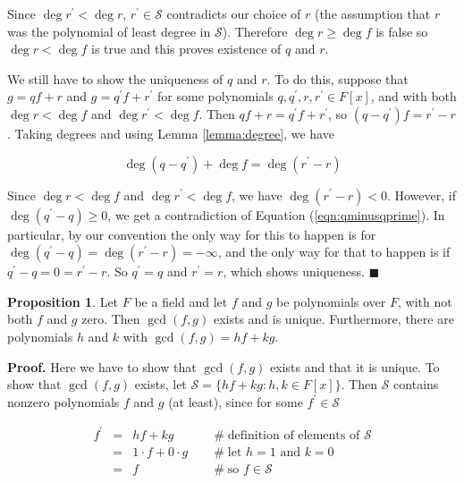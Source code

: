 \documentclass{article}
\theoremstyle{definition}
\newtheorem{proposition}{Proposition}[section]
\begin{document}
\bigskip
\noindent
Since $\deg r^\prime < \deg r$, $r^\prime \in \mathcal{S} $
contradicts our choice of $r$ (the assumption that $r$ was the
polynomial of least degree in $\mathcal{S}$).  Therefore $\deg r
\geq \deg f$ is false so $\deg r < \deg f$ is true and this
proves existence of $q$ and $r$.

\bigskip
\noindent
We still have to show the uniqueness of $q$ and $r$. To do this,
suppose that $g = qf +r$ and $g = q^{\prime} f + r^\prime$ for
some polynomials $q,q^\prime, r,r^\prime \in F[x]$, and with both
$\deg r < \deg f$ and $\deg r^\prime < \deg f$. Then $qf +r =
q^{\prime} f +r^{\prime}$, so $(q - q^{\prime})f = r^\prime -
r$. Taking degrees and using Lemma \ref{lemma:degree}, we have

\begin{equation}
\deg (q - q^{\prime}) + \deg f  = \deg (r^\prime - r)
\label{eqn:qminusqprime}
\end{equation}

\bigskip
\noindent
Since $\deg r < \deg f$ and $\deg r^\prime < \deg f$, we have
$\deg (r^\prime - r) < 0$. However, if $\deg(q^\prime - q) \geq
0$, we get a contradiction of Equation (\ref{eqn:qminusqprime}). 
In particular, by our convention the only way for this to happen 
is for $\deg(q^\prime - q) = \deg(r^\prime - r) = - \infty$, and 
the only way for that to happen is if $q^\prime - q = 0 = r^\prime 
- r$. So $q^\prime = q$ and $r^\prime =r$, which shows
uniqueness. $\blacksquare$

\bigskip
\begin{proposition}
Let $F$ be a field and let $f$ and $g$ be polynomials over $F$,
with not both $f$ and $g$ zero. Then $\gcd(f, g)$ exists and is
unique.  Furthermore, there are polynomials $h$ and $k$ with
$\gcd(f, g) = hf + kg$.
\end{proposition}

\noindent
\textbf{Proof.}  Here we have to show that $\gcd(f, g)$ exists
and that it is unique. To show that $\gcd(f, g)$ exists, let
$\mathcal{S} = \{hf + kg : h, k \in F [x]\}$. Then $\mathcal{S}$
contains nonzero polynomials $f$ and $g$ (at least), since for
some $f^\prime \in \mathcal{S}$

\begin{equation}
\begin{array}{rcll}
f^\prime
&=& hf +  kg                    
		&\quad \mathrel{\#} \text{definition of elements of } \mathcal{S} \\
[5pt]
&=& 1 \cdot f + 0 \cdot g       
		&\quad \mathrel{\#} \text{let $h = 1$ and $k = 0$}  \\
[5pt]
&=& f                           
		&\quad \mathrel{\#} \text{so $f \in \mathcal{S}$}
\end{array}
\label{eqn:f}
\end{equation}
\end{document}

